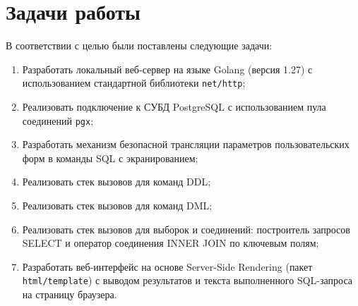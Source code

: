 \chapter{Задачи работы}
\label{cha:tasks}

В соответствии с целью были поставлены следующие задачи:

\begin{enumerate}
    \item Разработать локальный веб-сервер на языке Golang (версия 1.27) с использованием стандартной библиотеки \texttt{net/http};
    \item Реализовать подключение к СУБД PostgreSQL с использованием пула соединений \texttt{pgx};
    \item Разработать механизм безопасной трансляции параметров пользовательских форм в команды SQL с экранированием;
    \item Реализовать стек вызовов для команд DDL;
    \item Реализовать стек вызовов для команд DML;
    \item Реализовать стек вызовов для выборок и соединений: построитель запросов SELECT и оператор соединения INNER JOIN по ключевым полям;
    \item Разработать веб-интерфейс на основе Server-Side Rendering (пакет \texttt{html/template}) с выводом результатов и текста выполненного SQL-запроса на страницу браузера.
\end{enumerate}

